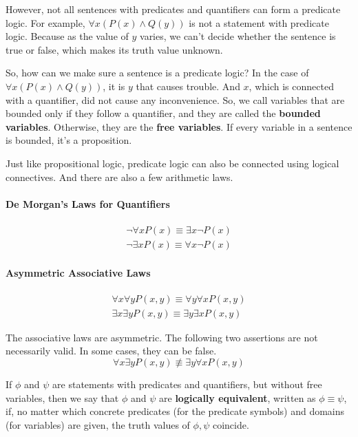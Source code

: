 However, not all sentences with predicates and quantifiers can form a predicate logic. For example, $\forall x (P(x) \wedge Q(y))$ is not a statement with predicate logic. Because as the value of $y$ varies, we can’t decide whether the sentence is true or false, which makes its truth value unknown.

So, how can we make sure a sentence is a predicate logic? In the case of $\forall x (P(x) \wedge Q(y))$, it is $y$ that causes trouble. And $x$, which is connected with a quantifier, did not cause any inconvenience. So, we call variables that are bounded only if they follow a quantifier, and they are called the \textbf{bounded variables}. Otherwise, they are the \textbf{free variables}. If every variable in a sentence is bounded, it’s a proposition.

Just like propositional logic, predicate logic can also be connected using logical connectives. And there are also a few arithmetic laws.

\paragraph{De Morgan's Laws for Quantifiers}
\begin{align*}
    \neg \forall x P(x) \equiv \exists x \neg P(x) \\
    \neg \exists x P(x) \equiv \forall x \neg P(x)
\end{align*}

\paragraph{Asymmetric Associative Laws}
\begin{align*}
    \forall x \forall y P(x,y) \equiv \forall y \forall x P(x,y) \\
    \exists x \exists y P(x,y) \equiv \exists y \exists x P(x,y)
\end{align*}

\newpage

\begin{note}
The associative laws are asymmetric. The following two assertions are not necessarily valid. In some cases, they can be false.
$$ \forall x \exists y P(x,y) \not\equiv \exists y \forall x P(x,y) $$
\end{note}

\begin{definition}
If $\phi$ and $\psi$ are statements with predicates and quantifiers, but without free variables, then we say that $\phi$ and $\psi$ are \textbf{logically equivalent}, written as $\phi \equiv \psi$, if, no matter which concrete predicates (for the predicate symbols) and domains (for variables) are given, the truth values of $\phi, \psi$ coincide.
\end{definition}


